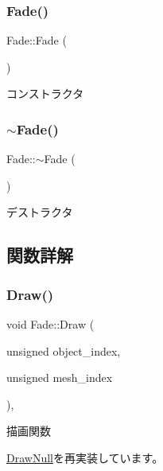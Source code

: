 \subsubsection{\texorpdfstring{Fade()}{Fade()}}
{\footnotesize\ttfamily Fade\+::\+Fade (\begin{DoxyParamCaption}{ }\end{DoxyParamCaption})}



コンストラクタ 

\mbox{\label{class_fade_a58ddf7585cb85bf84f5e83adbe2734f9}} 
\subsubsection{\texorpdfstring{$\sim$\+Fade()}{~Fade()}}
{\footnotesize\ttfamily Fade\+::$\sim$\+Fade (\begin{DoxyParamCaption}{ }\end{DoxyParamCaption})}



デストラクタ 



\subsection{関数詳解}
\mbox{\label{class_fade_a84a9e688650ac500e03cde74ff0210b8}} 
\subsubsection{\texorpdfstring{Draw()}{Draw()}}
{\footnotesize\ttfamily void Fade\+::\+Draw (\begin{DoxyParamCaption}\item[{unsigned}]{object\+\_\+index,  }\item[{unsigned}]{mesh\+\_\+index }\end{DoxyParamCaption})\hspace{0.3cm}{\ttfamily [override]}, {\ttfamily [virtual]}}



描画関数 



\mbox{\hyperlink{class_draw_null_afe50f6fd820b18d673f70f048743f339}{Draw\+Null}}を再実装しています。

